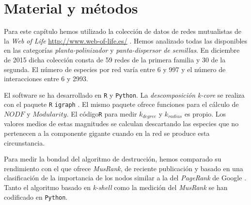 \section{Material y métodos}

Para este capítulo hemos utilizado la colección de datos de redes mutualistas de la \textit{Web of Life}  \url{http://www.web-of-life.es/} \cite{fortuna2014web}. Hemos analizado todas las disponibles en las categorías \textit{planta-polinizador} y \textit{panta-dispersor de semillas}. En diciembre de 2015 dicha colección consta de 59 redes de la primera familia y 30 de la segunda. El número de especies por red varía entre 6 y 997 y el número de interacciones entre 6 y 2993.

El software se ha desarrollado en \texttt{R} y \texttt{Python}. La \textit{descomposición k-core} se realiza con el paquete \texttt{R} \texttt{igraph} \cite{csardi2006igraph}. El mismo paquete ofrece funciones para el cálculo de $NODF$ y $Modularity$. El código\texttt{R} para medir ${k}_{degree}$ y ${k}_{radius}$ es propio. Los valores medios de estas magnitudes se calculan descartando las especies que no pertenecen a la componente gigante cuando en la red se produce esta circunstancia. 

Para medir la bondad del algoritmo de destrucción, hemos comparado su rendimiento con el que ofrece \textit{MusRank}, de reciente publicación y basado en una clasificación de la importancia de los nodos similar a la del \textit{PageRank} de Google  \citep{dominguez2015ranking}. Tanto el algoritmo basado en \textit{k-shell} como la medición del \textit{MusRank} se han codificado en \texttt{Python}.

